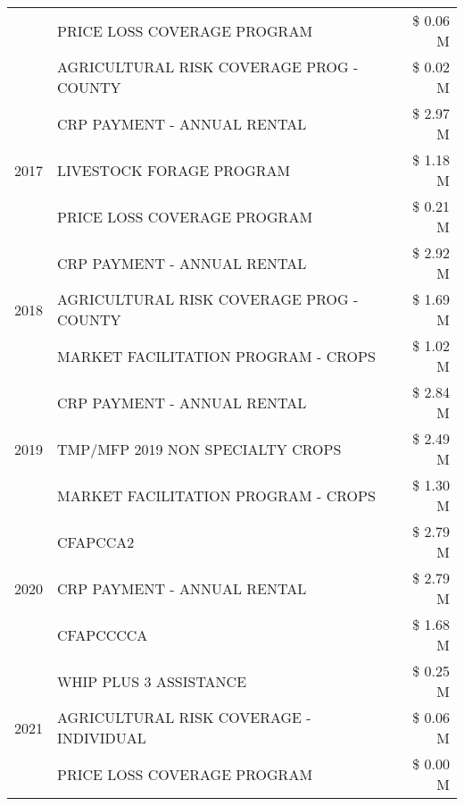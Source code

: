 \begin{tabular}{llr}
 & PRICE LOSS COVERAGE PROGRAM & \$ 0.06 M \\
 & AGRICULTURAL RISK COVERAGE PROG - COUNTY & \$ 0.02 M \\
\cline{1-3}
\multirow[t]{3}{*}{2017} & CRP PAYMENT - ANNUAL RENTAL & \$ 2.97 M \\
 & LIVESTOCK FORAGE PROGRAM & \$ 1.18 M \\
 & PRICE LOSS COVERAGE PROGRAM & \$ 0.21 M \\
\cline{1-3}
\multirow[t]{3}{*}{2018} & CRP PAYMENT - ANNUAL RENTAL & \$ 2.92 M \\
 & AGRICULTURAL RISK COVERAGE PROG - COUNTY & \$ 1.69 M \\
 & MARKET FACILITATION PROGRAM - CROPS & \$ 1.02 M \\
\cline{1-3}
\multirow[t]{3}{*}{2019} & CRP PAYMENT - ANNUAL RENTAL & \$ 2.84 M \\
 & TMP/MFP 2019 NON SPECIALTY CROPS & \$ 2.49 M \\
 & MARKET FACILITATION PROGRAM - CROPS & \$ 1.30 M \\
\cline{1-3}
\multirow[t]{3}{*}{2020} & CFAPCCA2 & \$ 2.79 M \\
 & CRP PAYMENT - ANNUAL RENTAL & \$ 2.79 M \\
 & CFAPCCCCA & \$ 1.68 M \\
\cline{1-3}
\multirow[t]{3}{*}{2021} & WHIP PLUS 3 ASSISTANCE & \$ 0.25 M \\
 & AGRICULTURAL RISK COVERAGE - INDIVIDUAL & \$ 0.06 M \\
 & PRICE LOSS COVERAGE PROGRAM & \$ 0.00 M \\
\cline{1-3}
\bottomrule
\end{tabular}
